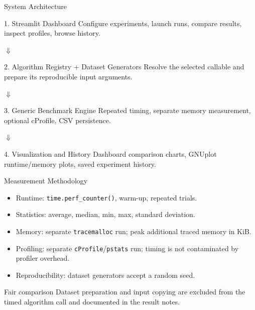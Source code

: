 \documentclass[aspectratio=169]{beamer}
\begin{document}
\begin{frame}{System Architecture}
  \small
  \begin{block}{1. Streamlit Dashboard}
    Configure experiments, launch runs, compare results, inspect profiles, browse history.
  \end{block}
  \vspace{-0.75em}
  \begin{center}\scriptsize$\Downarrow$\end{center}
  \vspace{-0.85em}
  \begin{block}{2. Algorithm Registry + Dataset Generators}
    Resolve the selected callable and prepare its reproducible input arguments.
  \end{block}
  \vspace{-0.75em}
  \begin{center}\scriptsize$\Downarrow$\end{center}
  \vspace{-0.85em}
  \begin{block}{3. Generic Benchmark Engine}
    Repeated timing, separate memory measurement, optional cProfile, CSV persistence.
  \end{block}
  \vspace{-0.75em}
  \begin{center}\scriptsize$\Downarrow$\end{center}
  \vspace{-0.85em}
  \begin{block}{4. Visualization and History}
    Dashboard comparison charts, GNUplot runtime/memory plots, saved experiment history.
  \end{block}
\end{frame}

\begin{frame}{Measurement Methodology}
  \begin{itemize}
    \item Runtime: \texttt{time.perf\_counter()}, warm-up, repeated trials.
    \item Statistics: average, median, min, max, standard deviation.
    \item Memory: separate \texttt{tracemalloc} run; peak additional traced memory in KiB.
    \item Profiling: separate \texttt{cProfile}/\texttt{pstats} run; timing is not contaminated by profiler overhead.
    \item Reproducibility: dataset generators accept a random seed.
  \end{itemize}
  \begin{alertblock}{Fair comparison}
    Dataset preparation and input copying are excluded from the timed algorithm call and documented in the result notes.
  \end{alertblock}
\end{frame}
\end{document}
